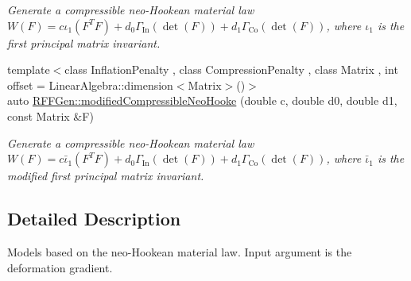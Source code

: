 \begin{DoxyCompactItemize}
\begin{DoxyCompactList}\small\item\em Generate a compressible neo-\/\-Hookean material law $ W(F)=c\iota_1(F^T F)+d_0\Gamma_\mathrm{In}(\det(F))+d_1\Gamma_\mathrm{Co}(\det(F)) $, where $\iota_1$ is the first principal matrix invariant. \end{DoxyCompactList}\item 
\hypertarget{group__Rubber_gad4985bcfe7726155b3b53f94094ebb3e}{{\footnotesize template$<$class Inflation\-Penalty , class Compression\-Penalty , class Matrix , int offset = Linear\-Algebra\-::dimension$<$\-Matrix$>$()$>$ }\\auto \hyperlink{group__Rubber_gad4985bcfe7726155b3b53f94094ebb3e}{R\-F\-F\-Gen\-::modified\-Compressible\-Neo\-Hooke} (double c, double d0, double d1, const Matrix \&F)}\label{group__Rubber_gad4985bcfe7726155b3b53f94094ebb3e}

\begin{DoxyCompactList}\small\item\em Generate a compressible neo-\/\-Hookean material law $ W(F)=c\bar\iota_1(F^T F)+d_0\Gamma_\mathrm{In}(\det(F))+d_1\Gamma_\mathrm{Co}(\det(F)) $, where $\bar\iota_1$ is the modified first principal matrix invariant. \end{DoxyCompactList}\end{DoxyCompactItemize}


\subsection{Detailed Description}
Models based on the neo-\/\-Hookean material law. Input argument is the deformation gradient. 
